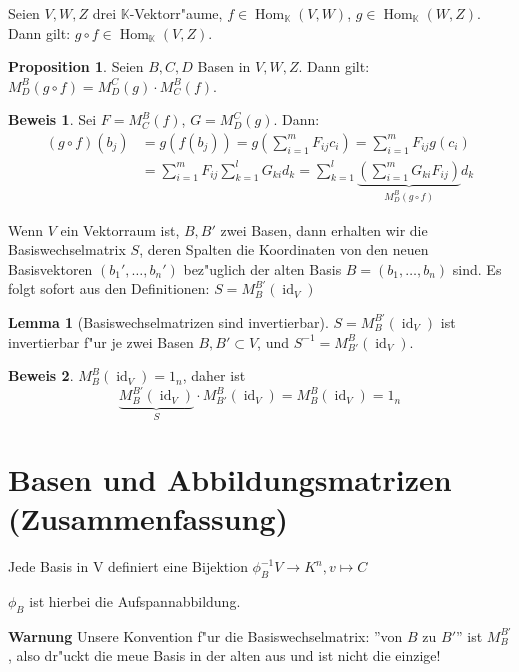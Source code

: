 \documentclass[oneside,fontsize=11pt,paper=a4,BCOR=0mm,DIV=12,automark,headsepline]{scrbook}
\DeclareMathOperator{\mHom}{Hom}
\DeclareMathOperator{\mId}{id}
\theoremstyle{remark}
\theoremstyle{definition}
\newtheorem*{proposition}{Proposition}
\newtheorem{lemma}{Lemma}[section]
\theoremstyle{definition}
\newtheorem*{prof}{Beweis}
\theoremstyle{remark}
\begin{document}
Seien \(V, W, Z\) drei \(\mathbb{K}\)-Vektorr"aume, \(f \in \mHom_\mathbb{K}(V, W)\), \(g \in \mHom_\mathbb{K}(W,Z)\). Dann gilt: \(g\circ f \in \mHom_\mathbb{K}(V,Z)\).

\begin{proposition}
	 Seien \(B,C,D\) Basen in
	\(V,W,Z\). Dann gilt: \(M^B_D(g\circ f) = M^C_D(g)\cdot M^B_C(f)\).
\end{proposition}
\begin{prof}
 Sei \(F = M^B_C(f)\), \(G = M^C_D(g)\). Dann:
 \begin{align*}
 (g\circ f)(b_j) &= g(f(b_j)) = g\left(\sum_{i=1}^m F_{ij}c_i\right) = \sum_{i=1}^mF_{ij}g(c_i) \\&= \sum_{i=1}^m F_{ij}\sum_{k=1}^lG_{ki}d_k = \sum_{k=1}^l\underbrace{\left(\sum_{i=1}^mG_{ki}F_{ij}\right)}_{M^B_D(g\circ f)}d_k
 \end{align*}
\end{prof}

Wenn \(V\) ein Vektorraum ist, \(B,B'\) zwei Basen, dann erhalten wir die
 Basiswechselmatrix \(S\), deren Spalten die Koordinaten von den neuen
 Basisvektoren \((b_1', \dots, b_n')\) bez"uglich der alten Basis \(B = (b_1,
 \dots, b_n)\) sind. Es folgt sofort aus den Definitionen:
 \(S=M^{B'}_B(\mId_V)\)
 
\begin{lemma}[Basiswechselmatrizen sind invertierbar]
	\(S = M^{B'}_B(\mId_V)\) ist invertierbar f"ur je zwei Basen \(B, B' \subset V\), und \(S^{-1} = M^B_{B'}(\mId_V)\).
\end{lemma}
\begin{prof}
	\(M^B_B(\mId_V)=1_n\), daher ist
	\[\underbrace{M^{B'}_B(\mId_V)}_{S}\cdot M^B_{B'}(\mId_V) = M^B_B(\mId_V) = 1_n \]
\end{prof}


\section{Basen und Abbildungsmatrizen (Zusammenfassung)}
\label{sec:baab}
Jede Basis in V definiert eine Bijektion $\phi_B^{-1}V\rightarrow K^n, v\mapsto C$
\begin{relation}
  $\phi_B$ ist hierbei die Aufspannabbildung.  
\end{relation}

\textbf{Warnung} Unsere Konvention f"ur die Basiswechselmatrix: ''von $B$ zu
$B'$'' ist $M^{B'}_B$, also dr"uckt die meue Basis in der alten aus und ist
nicht die einzige!
\end{document}
